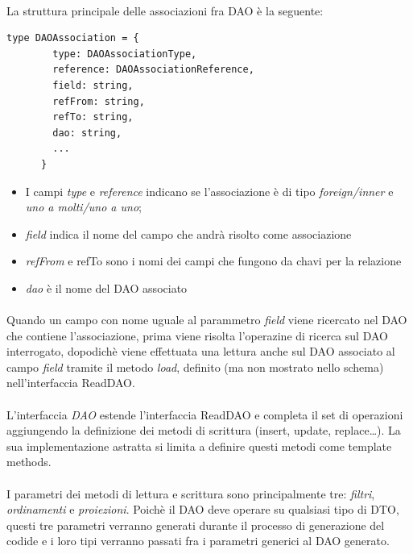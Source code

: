 \documentclass[a4paper, 12pt]{report}
\begin{document}
    \paragraph*{}
    La struttura principale delle associazioni fra DAO è la seguente:
    \begin{Verbatim}[samepage=true]
      type DAOAssociation = {
        type: DAOAssociationType,
        reference: DAOAssociationReference,
        field: string,
        refFrom: string,
        refTo: string,
        dao: string,
        ...
      }
    \end{Verbatim}
    \begin{itemize}
      \item I campi \emph{type} e \emph{reference} indicano se l'associazione è di tipo \emph{foreign/inner} e \emph{uno a molti/uno a uno};
      \item \emph{field} indica il nome del campo che andrà risolto come associazione
      \item \emph{refFrom} e refTo sono i nomi dei campi che fungono da chavi per la relazione
      \item \emph{dao} è il nome del DAO associato
    \end{itemize}
    \paragraph*{}
    Quando un campo con nome uguale al parammetro \emph{field} viene ricercato nel DAO che contiene l'associazione, prima viene risolta l'operazine di ricerca sul DAO interrogato, dopodichè
    viene effettuata una lettura anche sul DAO associato al campo \emph{field} tramite il metodo \emph{load}, definito (ma non mostrato nello schema) nell'interfaccia ReadDAO.
    \paragraph*{}
    L'interfaccia \emph{DAO} estende l'interfaccia ReadDAO e completa il set di operazioni aggiungendo la definizione dei metodi di scrittura (insert, update, replace\dots).
    La sua implementazione astratta si limita a definire questi metodi come template methods.
    \paragraph*{}
    I parametri dei metodi di lettura e scrittura sono principalmente tre: \emph{filtri}, \emph{ordinamenti} e \emph{proiezioni}.
    Poichè il DAO deve operare su qualsiasi tipo di DTO, questi tre parametri verranno generati durante il processo di generazione del codide e i loro tipi
    verranno passati fra i parametri generici al DAO generato.
\end{document}
